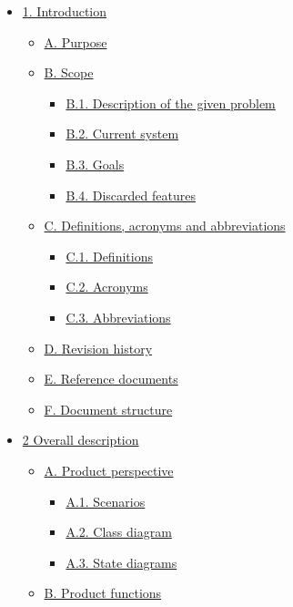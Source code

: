 \begin{itemize}
\tightlist
\item
  \protect\hyperlink{1-introduction}{1. Introduction}

  \begin{itemize}
  \tightlist
  \item
    \protect\hyperlink{a-purpose}{A. Purpose}
  \item
    \protect\hyperlink{b-scope}{B. Scope}

    \begin{itemize}
    \tightlist
    \item
      \protect\hyperlink{b1-description-of-the-given-problem}{B.1.
      Description of the given problem}
    \item
      \protect\hyperlink{b2-current-system}{B.2. Current system}
    \item
      \protect\hyperlink{b3-goals}{B.3. Goals}
    \item
      \protect\hyperlink{b4-discarded-features}{B.4. Discarded features}
    \end{itemize}
  \item
    \protect\hyperlink{c-definitions-acronyms-and-abbreviations}{C.
    Definitions, acronyms and abbreviations}

    \begin{itemize}
    \tightlist
    \item
      \protect\hyperlink{c1-definitions}{C.1. Definitions}
    \item
      \protect\hyperlink{c2-acronyms}{C.2. Acronyms}
    \item
      \protect\hyperlink{c3-abbreviations}{C.3. Abbreviations}
    \end{itemize}
  \item
    \protect\hyperlink{d-revision-history}{D. Revision history}
  \item
    \protect\hyperlink{e-reference-documents}{E. Reference documents}
  \item
    \protect\hyperlink{f-document-structure}{F. Document structure}
  \end{itemize}
\item
  \protect\hyperlink{2-overall-description}{2 Overall description}

  \begin{itemize}
  \tightlist
  \item
    \protect\hyperlink{a-product-perspective}{A. Product perspective}

    \begin{itemize}
    \tightlist
    \item
      \protect\hyperlink{a1-scenarios}{A.1. Scenarios}
    \item
      \protect\hyperlink{a2-class-diagram}{A.2. Class diagram}
    \item
      \protect\hyperlink{a3-state-diagrams}{A.3. State diagrams}
    \end{itemize}
  \item
    \protect\hyperlink{b-product-functions}{B. Product functions}


\end{itemize}
\end{itemize}
